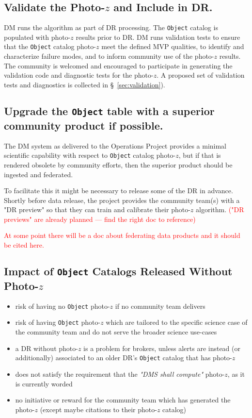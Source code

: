 \documentclass[DM,lsstdraft,toc]{lsstdoc}
\begin{document}
\subsection {Validate the Photo-$z$ and Include in DR.}

DM runs the algorithm as part of DR processing.
The {\tt Object} catalog is populated with photo-$z$ results prior to DR.
DM runs validation tests to ensure that the {\tt Object} catalog photo-$z$ meet the defined MVP qualities, to identify and characterize failure modes, and to inform community use of the photo-$z$ results. 
The community is welcomed and encouraged to participate in generating the validation code and diagnostic tests for the photo-$z$.
A proposed set of validation tests and diagnostics is collected in \S~\ref{sec:validation}).


\subsection{Upgrade the {\tt Object} table with a superior community product if possible.}

The DM system as delivered to the Operations Project provides a minimal scientific capability with respect to {\tt Object} catalog photo-$z$, but if that is rendered obsolete by community efforts, then the superior product should be ingested and federated.

To facilitate this it might be necessary to release some of the DR in advance.
Shortly before data release, the project provides the community team(s) with a "DR preview" so that they can train and calibrate their photo-$z$ algorithm. \textcolor{red}{("DR previews" are already planned --- find the right doc to reference)}

\textcolor{red}{At some point there will be a doc about federating data products and it should be cited here.}

\subsection{Impact of {\tt Object} Catalogs Released Without Photo-$z$}

\begin{itemize}%
\item risk of having no {\tt Object} photo-$z$ if no community team delivers
\item risk of having {\tt Object} photo-$z$ which are tailored to the specific science case of the community team and do not serve the broader science use-cases
\item a DR without photo-$z$ is a problem for brokers, unless alerts are instead (or additionally) associated to an older DR's {\tt Object} catalog that has photo-$z$
\item does not satisfy the requirement that the {\it "DMS shall compute"} photo-$z$, as it is currently worded
\item no initiative or reward for the community team which has generated the photo-$z$ (except maybe citations to their photo-$z$ catalog)
\end{itemize}
\end{document}
